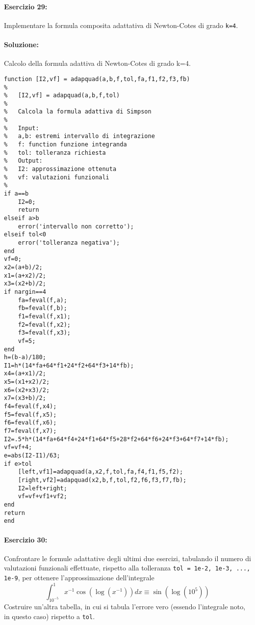 \documentclass[12pt]{article}
\begin{document}
\newpage
\paragraph{Esercizio 29:}
Implementare la formula composita adattativa di Newton-Cotes di grado \texttt{k=4}.
\paragraph{Soluzione:} Calcolo della formula adattiva di Newton-Cotes di grado k=4.
\begin{lstlisting}[frame=single]
function [I2,vf] = adapquad(a,b,f,tol,fa,f1,f2,f3,fb)
%
%   [I2,vf] = adapquad(a,b,f,tol)
% 
%   Calcola la formula adattiva di Simpson
%
%   Input:
%   a,b: estremi intervallo di integrazione
%   f: function funzione integranda
%   tol: tolleranza richiesta
%   Output:
%   I2: approssimazione ottenuta
%   vf: valutazioni funzionali
%
if a==b
    I2=0;
    return
elseif a>b
    error('intervallo non corretto');
elseif tol<0
    error('tolleranza negativa');
end
vf=0;
x2=(a+b)/2;
x1=(a+x2)/2;
x3=(x2+b)/2;
if nargin==4
    fa=feval(f,a);
    fb=feval(f,b);
    f1=feval(f,x1);
    f2=feval(f,x2);
    f3=feval(f,x3);
    vf=5;
end
h=(b-a)/180;
I1=h*(14*fa+64*f1+24*f2+64*f3+14*fb);
x4=(a+x1)/2;
x5=(x1+x2)/2;
x6=(x2+x3)/2;
x7=(x3+b)/2;
f4=feval(f,x4);
f5=feval(f,x5);
f6=feval(f,x6);
f7=feval(f,x7);
I2=.5*h*(14*fa+64*f4+24*f1+64*f5+28*f2+64*f6+24*f3+64*f7+14*fb);
vf=vf+4;
e=abs(I2-I1)/63;
if e>tol
    [left,vf1]=adapquad(a,x2,f,tol,fa,f4,f1,f5,f2);
    [right,vf2]=adapquad(x2,b,f,tol,f2,f6,f3,f7,fb);
    I2=left+right;
    vf=vf+vf1+vf2;
end
return
end    
\end{lstlisting}


\newpage
\paragraph{Esercizio 30:}
Confrontare le formule adattative degli ultimi due esercizi, tabulando il numero
di valutazioni funzionali effettuate, rispetto alla tolleranza \texttt{tol = 1e-2, 1e-3, ..., 1e-9}, per
ottenere l’approssimazione dell’integrale \\
$$\int_{10^{-5}}^{1}x^{-1}\cos(\log(x^{-1}))dx\equiv\sin(\log(10^{5}))$$
Costruire un’altra tabella, in cui si tabula l’errore vero (essendo l’integrale noto, in questo caso)
rispetto a \texttt{tol}.
\end{document}
